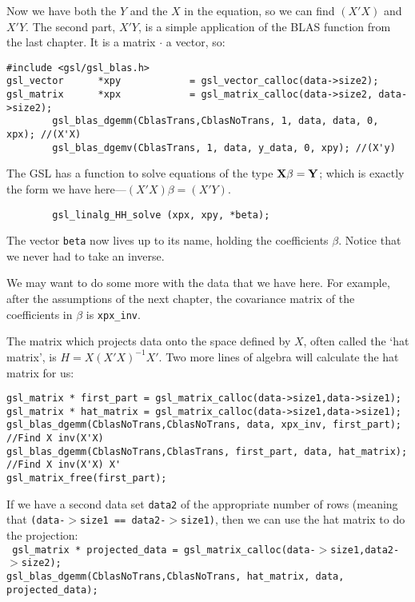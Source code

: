 Now we have both the $Y$ and the $X$ in the equation, so we can find $(X'X)$ and $X'Y$.
The second part, $X'Y$, is a simple application of the BLAS function from the last chapter. It is a
matrix $\cdot$ a vector, so:
\begin{verbatim}
#include <gsl/gsl_blas.h>
gsl_vector      *xpy            = gsl_vector_calloc(data->size2);
gsl_matrix      *xpx            = gsl_matrix_calloc(data->size2, data->size2);
        gsl_blas_dgemm(CblasTrans,CblasNoTrans, 1, data, data, 0, xpx); //(X'X)
        gsl_blas_dgemv(CblasTrans, 1, data, y_data, 0, xpy); //(X'y)
\end{verbatim}

The GSL has a function to solve equations of the type ${\bf X} \beta =
{\bf Y}$; which is exactly the form we have here---$(X'X)\beta = (X'Y)$.  \label{ols}
\begin{verbatim}
        gsl_linalg_HH_solve (xpx, xpy, *beta);
\end{verbatim}

The vector {\tt beta} now lives up to its name, holding the coefficients
$\beta$. Notice that we never had to take an inverse.  

We may want to do some more with the data that we have here. For example, after the assumptions of the
next chapter, the covariance matrix of the coefficients in $\beta$ is {\tt xpx\_inv}.

The matrix which projects data onto the space defined by $X$, often
called the `hat matrix', is $H = X(X'X)^{-1}X'$. Two more lines of algebra will calculate the hat matrix
for us:

\begin{verbatim}
gsl_matrix * first_part = gsl_matrix_calloc(data->size1,data->size1);
gsl_matrix * hat_matrix = gsl_matrix_calloc(data->size1,data->size1);
gsl_blas_dgemm(CblasNoTrans,CblasNoTrans, data, xpx_inv, first_part);	//Find X inv(X'X)
gsl_blas_dgemm(CblasNoTrans,CblasTrans, first_part, data, hat_matrix);	//Find X inv(X'X) X'
gsl_matrix_free(first_part);
\end{verbatim}

If we have a second data set {\tt data2} of the appropriate number of
rows (meaning that {\tt (data-$>$size1 == data2-$>$size1)}, then we can use the hat matrix to do the projection:\\
{\tt
gsl\_matrix * projected\_data = gsl\_matrix\_calloc(data-$>$size1,data2-$>$size2);\\
gsl\_blas\_dgemm(CblasNoTrans,CblasNoTrans, hat\_matrix, data, projected\_data);
}




